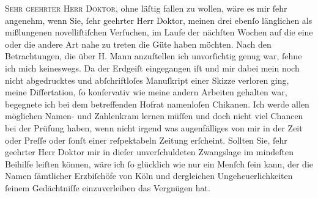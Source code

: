 \pstart{}\textsc{Sehr geehrter Herr Doktor,}\pend\vspace{0.5em}
\pstart
           ohne läſtig fallen zu wollen, wäre es mir{ }ſehr angenehm, wenn Sie,{ }ſehr geehrter Herr
               Doktor, meinen drei ebenſo länglichen als mißlungenen novelliſtiſchen Verſuchen, im Laufe
               der nächſten Wochen auf die eine oder die andere Art nahe zu treten die Güte haben
               möchten. Nach den Betrachtungen, die über H.
                  Mann anzuſtellen ich unvorſichtig genug war,{ }ſehne ich mich keineswegs. Da
                  {\pb}der Erdgeiſt eingegangen iſt und mir dabei mein noch nicht abgedrucktes und
               abſchriftloſes Manuſkript einer Skizze verloren ging, meine Diſſertation,{ }ſo konſervativ wie meine
               andern Arbeiten gehalten war, begegnete ich bei dem betreffenden Hofrat namenloſen Chikanen. Ich werde allen
               möglichen Namen- und Zahlenkram lernen müſſen und doch nicht viel Chancen bei der
               Prüfung haben, wenn nicht irgend was augenfälliges von mir in der Zeit oder Preſſe oder{ }ſonſt
               einer reſpektabeln Zeitung erſcheint. Sollten Sie, {\pb}ſehr geehrter Herr Doktor mir in dieſer
               unverſchuldeten Zwangslage im mindeſten Beihilfe leiſten können, wäre ich{ }ſo
               glücklich wie nur ein Menſch{ }ſein kann, der die Namen{ }ſämtlicher Erzbiſchöfe von Köln und dergleichen Ungeheuerlichkeiten{ }ſeinem
               Gedächtniſſe einzuverleiben das Vergnügen hat.\pend
           
